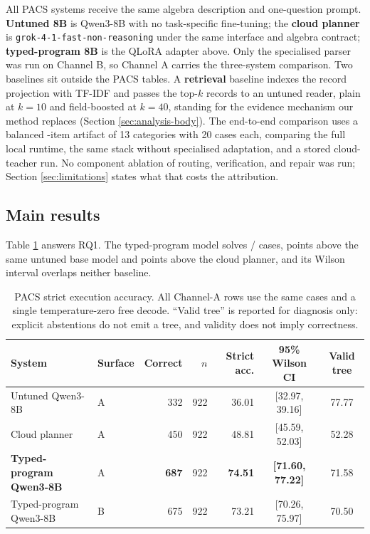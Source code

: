 All PACS systems receive the same algebra description and one-question prompt.  \textbf{Untuned
8B} is Qwen3-8B with no task-specific fine-tuning; the \textbf{cloud planner} is
\texttt{grok-4-1-fast-non-reasoning} under the same interface and algebra contract;
\textbf{typed-program 8B} is the QLoRA adapter above.  Only the specialised parser was run on
Channel B, so Channel A carries the three-system comparison.  Two baselines sit outside the PACS
tables.  A \textbf{retrieval} baseline indexes the record projection with TF-IDF and passes the
top-$k$ records to an untuned reader, plain at $k{=}10$ and field-boosted at $k{=}40$, standing
for the evidence mechanism our method replaces (Section \ref{sec:analysis-body}).  The end-to-end
comparison uses a balanced \RuntimeN{}-item artifact of 13 categories with 20 cases each,
comparing the full local runtime, the same stack without specialised adaptation, and a stored
cloud-teacher run.  No component ablation of routing, verification, and repair was run; Section
\ref{sec:limitations} states what that costs the attribution.

\subsection{Main results}

Table \ref{tab:pacs-main} answers RQ1.  The typed-program model solves
\PacsOursCorrectA/\PacsN{} cases, \PacsGainBase{} points above the same untuned base model and
\PacsGainTeacher{} points above the cloud planner, and its Wilson interval overlaps neither
baseline.

\begin{table}[t]
  \caption{PACS strict execution accuracy.  All Channel-A rows use the same \PacsN{} cases and a
  single temperature-zero free decode.  ``Valid tree'' is reported for diagnosis only: explicit
  abstentions do not emit a tree, and validity does not imply correctness.}
  \label{tab:pacs-main}
  \centering
  \small
  \begin{tabular}{llrrrcc}
    \toprule
    System & Surface & Correct & $n$ & Strict acc. & 95\% Wilson CI & Valid tree \\
    \midrule
    Untuned Qwen3-8B & A & 332 & 922 & 36.01 & [32.97, 39.16] & 77.77 \\
    Cloud planner & A & 450 & 922 & 48.81 & [45.59, 52.03] & 52.28 \\
    \textbf{Typed-program Qwen3-8B} & A & \textbf{687} & 922 & \textbf{74.51}
      & \textbf{[71.60, 77.22]} & 71.58 \\
    Typed-program Qwen3-8B & B & 675 & 922 & 73.21 & [70.26, 75.97] & 70.50 \\
    \bottomrule
  \end{tabular}
\end{table}

